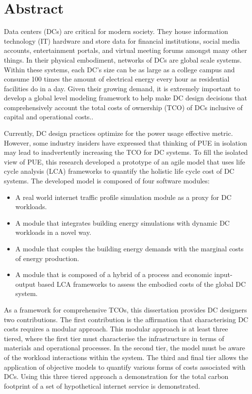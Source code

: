 \section{Abstract}

Data centers (DCs) are critical for modern society. They house information technology (IT) hardware and store data for financial institutions, social media accounts, entertainment portals, and virtual meeting forums amongst many other things. In their physical embodiment, networks of DCs are global scale systems. Within these systems, each DC’s size can be as large as a college campus and consume 100 times the amount of electrical energy every hour as residential facilities do in a day. Given their growing demand, it is extremely important to develop a global level modeling framework to help make DC design decisions that comprehensively account the total costs of ownership (TCO) of DCs inclusive of capital and operational costs..

Currently, DC design practices optimize for the power usage effective metric. However, some industry insiders have expressed that thinking of PUE in isolation may lead to inadvertently increasing the TCO for DC systems. To fill the isolated view of PUE, this research developed a prototype of an agile model that uses life cycle analysis (LCA) frameworks to quantify the holistic life cycle cost of DC systems. The developed model is composed of four software modules: 

\begin{itemize}
\item A real world internet traffic profile simulation module as a proxy for DC workloads. 
\item A module that integrates building energy simulations with dynamic DC workloads in a novel way.
\item A module that couples the building energy demands with the marginal costs of energy production.
\item A module that is composed of a hybrid of a process and economic input-output based LCA frameworks to assess the embodied costs of the global DC system.
\end{itemize}
As a framework for comprehensive TCOs, this dissertation provides DC designers two contributions. The first contribution is the affirmation that characterising DC costs requires a modular approach. This modular approach is at least three tiered, where the first tier must characterise the infrastructure in terms of materials and operational processes. In the second tier, the model must be aware of the workload interactions within the system. The third and final tier allows the application of objective models to quantify various forms of costs associated with DCs. Using this three tiered approach a demonstration for the total carbon footprint of a set of hypothetical internet service is demonstrated.   

